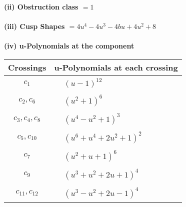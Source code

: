 \documentclass[1p]{elsarticle_modified}
\theoremstyle{definition}
\begin{document}
\flushleft \textbf{(ii) Obstruction class $= 1$}\\~\\
\flushleft \textbf{(iii) Cusp Shapes $= 4 u^4-4 u^3-4 b u+4 u^2+8$}\\~\\
\newpage\renewcommand{\arraystretch}{1}
\flushleft \textbf{(iv) u-Polynomials at the component}\newline \\
\begin{tabular}{m{50pt}|m{274pt}}
Crossings & \hspace{64pt}u-Polynomials at each crossing \\
\hline $$\begin{aligned}c_{1}\end{aligned}$$&$\begin{aligned}
&(u-1)^{12}
\end{aligned}$\\
\hline $$\begin{aligned}c_{2},c_{6}\end{aligned}$$&$\begin{aligned}
&(u^2+1)^6
\end{aligned}$\\
\hline $$\begin{aligned}c_{3},c_{4},c_{8}\end{aligned}$$&$\begin{aligned}
&(u^4- u^2+1)^3
\end{aligned}$\\
\hline $$\begin{aligned}c_{5},c_{10}\end{aligned}$$&$\begin{aligned}
&(u^6+u^4+2 u^2+1)^2
\end{aligned}$\\
\hline $$\begin{aligned}c_{7}\end{aligned}$$&$\begin{aligned}
&(u^2+u+1)^6
\end{aligned}$\\
\hline $$\begin{aligned}c_{9}\end{aligned}$$&$\begin{aligned}
&(u^3+u^2+2 u+1)^4
\end{aligned}$\\
\hline $$\begin{aligned}c_{11},c_{12}\end{aligned}$$&$\begin{aligned}
&(u^3- u^2+2 u-1)^4
\end{aligned}$\\
\hline
\end{tabular}\\~\\
\end{document}

